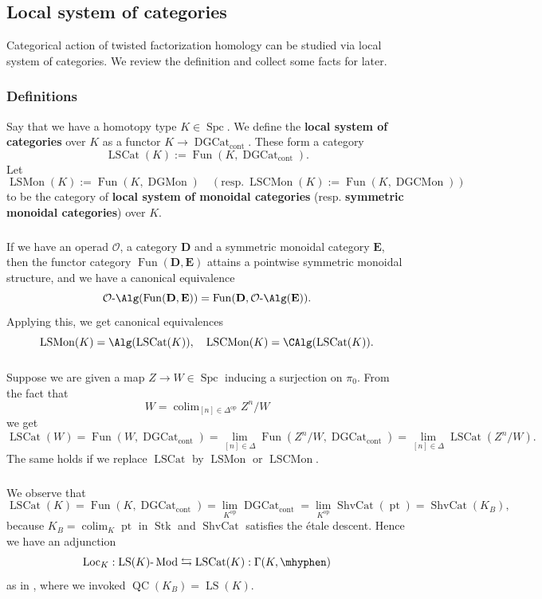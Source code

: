 \documentclass[10pt]{amsart}
\newcommand{\sssec}{\subsubsection}
\theoremstyle{remark}
\newcommand{\te}{\text}
\newcommand{\on}{\operatorname}
\newcommand{\cO}{\mathcal{O}}
\newcommand{\ShvCat}{\on{ShvCat}}
\newcommand{\DGcat}{\on{DGCat}_{\on{cont}}}
\newcommand{\LSCat}{\on{LSCat}}
\newcommand{\LSMon}{\on{LSMon}}
\newcommand{\LSCMon}{\on{LSCMon}}
\newcommand{\DGCatMon}{\on{DGMon}}
\newcommand{\DGCatSymMon}{\on{DGCMon}}
\newcommand{\lMod}{\text{-}\on{Mod}}
\newcommand{\QC}{\on{QC}}
\newcommand{\Loc}{\on{Loc}}
\newcommand{\LS}{\on{LS}}
\newcommand{\Stk}{\on{Stk}}
\newcommand{\Spc}{\on{Spc}}
\newcommand{\Fun}{\on{Fun}}
\DeclareMathOperator{\op}{op}
\DeclareMathOperator{\colim}{colim}
\newcommand{\bD}{\mathbf{D}}
\newcommand{\bE}{\mathbf{E}}
\newcommand{\pt}{\on{pt}}
\begin{document}
\subsection{Local system of categories}\label{ssec: LSCat}
Categorical action of twisted factorization homology can be studied via local system of categories. We review the definition and collect some facts for later.

   \sssec{Definitions}
   Say that we have a homotopy type $K\in\Spc$. We define the \textbf{local system of categories} over $K$ as a functor $K\rightarrow \DGcat$. These form a category 
   \[\LSCat(K):=\Fun(K,\DGcat).\]
   Let
   \[\LSMon(K):=\Fun(K,\DGCatMon)\quad (\te{resp.}\ \on{LSCMon}(K):=\Fun(K,\DGCatSymMon))\]
   to be the category of \textbf{local system of monoidal categories} (resp. \textbf{symmetric monoidal categories}) over $K$.
  
  \sssec{}  
   If we have an operad $\cO$, a category $\bD$ and a symmetric monoidal category $\bE$, then the functor category $\Fun(\bD,\bE)$ attains a pointwise symmetric monoidal structure, and we have a canonical equivalence
   \[\cO\text{-}\Alg(\Fun(\bD,\bE))= \Fun(\bD,\cO\text{-}\Alg(\bE)).\]
Applying this, we get canonical equivalences
\begin{equation}\label{eq: LSMon as alg obj}
    \LSMon(K)=\Alg(\LSCat(K)),\quad \LSCMon(K)=\CAlg(\LSCat(K)).
\end{equation}

\sssec{}\label{sssec: descent of LSMon}
Suppose we are given a map $Z\rightarrow W\in \Spc$ inducing a surjection on $\pi_0$. From the fact that
\[W=\colim_{[n]\in\Delta^{\op}}Z^n/W\]
we get
\[\LSCat(W)=\Fun(W,\DGcat)=\lim_{[n]\in\Delta}\Fun(Z^n/W, \DGcat)=\lim_{[n]\in \Delta}\LSCat(Z^n/W).\] 
The same holds if we replace $\LSCat$ by $\LSMon$ or $\LSCMon$.
   

\sssec{}\label{sssec: LSCat global section}
We observe that
\begin{equation}\label{eq: LSCat as ShvCat}
    \LSCat(K)=\Fun(K,\DGcat)=\lim_{K^{\op}}\DGcat =\lim_{K^{\op}}\ShvCat(\pt)=\ShvCat(K_B),
\end{equation}
because $K_B =\colim_{K} \pt$ in $\Stk$ and $\ShvCat$ satisfies the \'etale descent. Hence we have an adjunction
\begin{equation}\label{eq: Loc Gamma adjunction}
    \Loc_{K}: \LS(K)\lMod \leftrightarrows \LSCat(K) :\Gamma(K,\mhyphen)
\end{equation}
as in \cite[Sect. 1.3.1]{Ga}, where we invoked $\QC(K_B)=\LS(K)$.
\medskip
\end{document}
